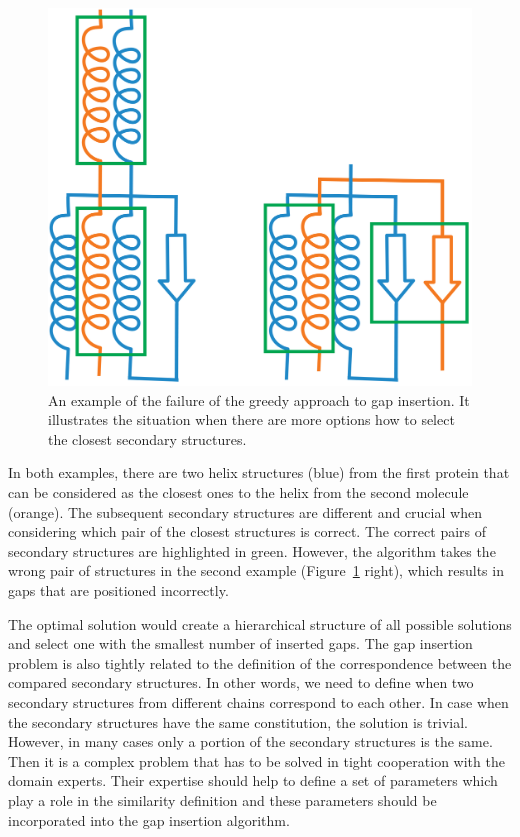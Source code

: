 \documentclass[twocolumn]{bmcart}%
\begin{document}
\begin{figure}[thb]
  \centering
  \includegraphics[width=0.9\linewidth]{pics/fail.png}
  \caption{An example of the failure of the greedy approach to gap insertion. It illustrates the situation when there are more options how to select the closest secondary structures.}
  \label{fig:fail}
\end{figure}

In both examples, there are two helix structures (blue) from the first protein that can be considered as the closest ones to the helix from the second molecule (orange).
The subsequent secondary structures are different and crucial when considering which pair of the closest structures is correct. 
The correct pairs of secondary structures are highlighted in green.
However, the algorithm takes the wrong pair of structures in the second example (Figure~\ref{fig:fail} right), which results in gaps that are positioned incorrectly.


The optimal solution would create a hierarchical structure of all possible solutions and select one with the smallest number of inserted gaps.
The gap insertion problem is also tightly related to the definition of the correspondence between the compared secondary structures.
In other words, we need to define when two secondary structures from different chains correspond to each other.
In case when the secondary structures have the same constitution, the solution is trivial.
However, in many cases only a portion of the secondary structures is the same.
Then it is a complex problem that has to be solved in tight cooperation with the domain experts.
Their expertise should help to define a set of parameters which play a role in the similarity definition and these parameters should be incorporated into the gap insertion algorithm. 
\end{document}
